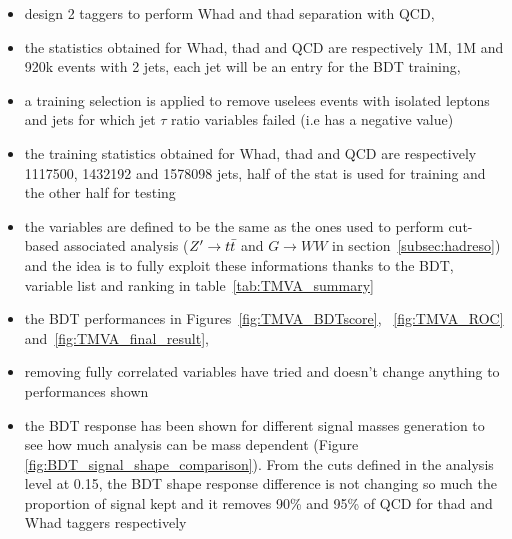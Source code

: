 \documentclass{cernrep}
\begin{document}
\begin{itemize}
\item design 2 taggers to perform Whad and thad separation with QCD,
\item the statistics obtained for Whad, thad and QCD are respectively 1M, 1M and 920k events with 2 jets, each jet will be an entry for the BDT training,
\item a training selection is applied to remove uselees events with isolated leptons and jets for which jet $\tau$ ratio variables failed (i.e has a negative value)
\item the training statistics obtained for Whad, thad and QCD are respectively 1117500, 1432192 and 1578098 jets, half of the stat is used for training and the other half for testing
\item the variables are defined to be the same as the ones used to perform cut-based associated analysis ($Z^{\prime} \rightarrow t\bar{t}$ and $G \rightarrow WW$ in section~\ref{subsec:hadreso}) and the idea is to fully exploit these informations thanks to the BDT, variable list and ranking in table~\ref{tab:TMVA_summary}
\item the BDT performances in Figures~\ref{fig:TMVA_BDTscore}, ~\ref{fig:TMVA_ROC} and~\ref{fig:TMVA_final_result}, 
\item removing fully correlated variables have tried and doesn't change anything to performances shown
\item the BDT response has been shown for different signal masses generation to see how much analysis can be mass dependent (Figure \ref{fig:BDT_signal_shape_comparison}). From the cuts defined in the analysis level at 0.15, the BDT shape response difference is not changing so much the proportion of signal kept and it removes 90\% and 95\% of QCD for thad and Whad taggers respectively
\end{itemize}
\end{document}
